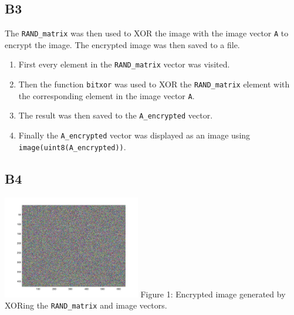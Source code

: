 \documentclass[12pt, letterpaper, titlepage, hidelinks]{article}
\begin{document}
		\subsection{B3}
			The \verb|RAND_matrix| was then used to XOR the image with the image vector \verb|A| to encrypt the image. The encrypted image was then saved to a file.
			\begin{enumerate}
				\item First every element in the \verb|RAND_matrix| vector was visited.
				\item Then the function \verb|bitxor| was used to XOR the \verb|RAND_matrix| element with the corresponding element in the image vector \verb|A|.
				\item The result was then saved to the \verb|A_encrypted| vector.
				\item Finally the \verb|A_encrypted| vector was displayed as an image using \verb|image(uint8(A_encrypted))|.
			\end{enumerate}
		\subsection{B4}
			\includegraphics[width=0.45\textwidth]{encrypted_image} \newline
			Figure 1: Encrypted image generated by XORing the \verb|RAND_matrix| and image vectors.
\end{document}

